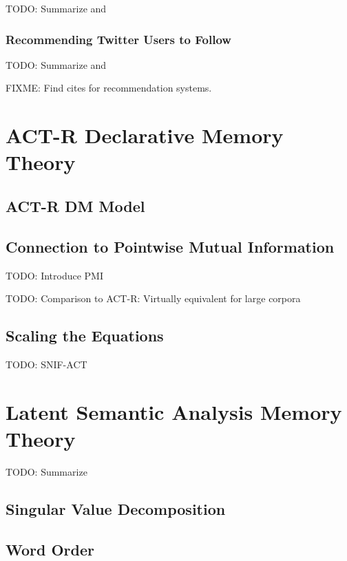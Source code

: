 \documentclass[man]{apa6}
\begin{document}
TODO: Summarize and \cite{Bennett2007}

\subsubsection{Recommending Twitter Users to Follow}

TODO: Summarize and \cite{Hannon2010}

FIXME: Find cites for recommendation systems.

\section{ACT-R Declarative Memory Theory}

\cite{Anderson2004}

\subsection{ACT-R DM Model}

\subsection{Connection to Pointwise Mutual Information}

TODO: Introduce PMI \cite{Farahat2004}

TODO: Comparison to ACT-R: Virtually equivalent for large corpora \cite{Farahat2004}

\subsection{Scaling the Equations}

\cite{Douglass2010}

TODO: SNIF-ACT \cite{Fu2007} \cite{Pirolli2003}

\section{Latent Semantic Analysis Memory Theory}

TODO: Summarize \cite{Landauer1997}

\subsection{Singular Value Decomposition}

\subsection{Word Order}
\end{document}
